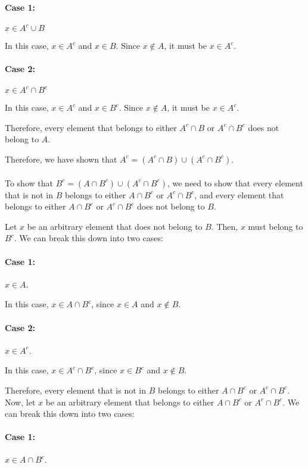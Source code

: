 \paragraph{Case 1:} $x \in A^c \cup B$

In this case, $x \in A^c$ and $x \in B$. Since $x \not\in A$, it must be $x \in A^c$.

\paragraph{Case 2:} $x \in A^c \cap B^c$

In this case, $x\in A^c$ and $x\in B^c$. Since $x \not\in A$, it must be $x \in A^c$.

Therefore, every element that belongs to either $A^c \cap B$ or $A^c \cap B^c$ does not belong to $A$.

Therefore, we have shown that $A^c = (A^c \cap B) \cup (A^c \cap B^c)$.\\\\

To show that $B^c = (A \cap B^c) \cup (A^c \cap B^c)$,
we need to show that every element that is not in $B$ belongs to either $A \cap B^c$
or $A^c \cap B^c$, and every element that belongs to either $A \cap B^c$
or $A^c \cap B^c$ does not belong to $B$.

Let $x$ be an arbitrary element that does not belong to $B$. Then, $x$ must belong to $B^c$.
We can break this down into two cases:

\paragraph{Case 1:} $x \in A$.

In this case, $x\in A \cap B^c$, since $x \in A$ and $x \not\in B$.

\paragraph{Case 2:} $x \in A^c$.

In this case, $x \in A^c \cap B^c$, since $x \in B^c$ and $x \not \in B$.

Therefore, every element that is not in $B$ belongs to either $A \cap B^c$ or $A^c \cap B^c$.
Now, let $x$ be an arbitrary element that belongs to either $A \cap B^c$ or $A^c \cap B^c$.
We can break this down into two cases:

\paragraph{Case 1:} $x \in A \cap B^c$.

